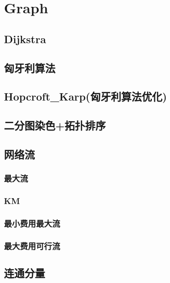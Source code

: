 \documentclass[twocolumn,a4paper]{article}  %
\begin{document}
\newpage
\pagestyle{empty}
\renewcommand{\contentsname}{Contest}
\tableofcontents %
\newpage\clearpage
\newpage
\pagestyle{fancy}
\setcounter{page}{1}   %
\section{Graph}
\subsection{Dijkstra}

\subsection{匈牙利算法}

\subsection{Hopcroft\_Karp(匈牙利算法优化)}

\subsection{二分图染色+拓扑排序}

\subsection{网络流}
\subsubsection{最大流}

\subsubsection{KM}

\subsubsection{最小费用最大流}

\subsubsection{最大费用可行流}

\subsection{连通分量}
\end{document}
